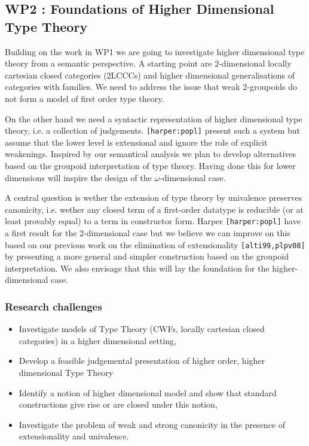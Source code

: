 \documentclass[a4paper]{article}
\renewcommand{\cite}[1]{{\tt[#1]}}
\begin{document}
\subsection*{WP2 : Foundations of Higher Dimensional Type Theory}

Building on the work in WP1 we are going to investigate higher
dimensional type theory from a semantic perspective. A starting point
are 2-dimensional locally cartesian closed categories (2LCCCs) and
higher dimensional generalisations of categories with families. We
need to address the issue that weak 2-groupoids do not form a model of
first order type theory. 

On the other hand we need a syntactic representation of higher
dimensional type theory, i.e. a collection of
judgements. \cite{harper:popl} present such a system but assume that
the lower level is extensional and ignore the role of explicit
weakenings. Inspired by our semantical analysis we plan to develop
alternatives based on the groupoid interpretation of type theory.
Having done this for lower dimensions will inspire the design of
the $\omega$-dimensional case.

A central question is wether the extension of type theory by
univalence preserves canonicity, i.e. wether any closed term of a
first-order datatype is reducible (or at least provably equal) to a
term in constructor form. Harper \cite{harper:popl} have a first
result for the 2-dimensional case but we believe we can improve on
this based on our previous work on the elimination of extensionality
\cite{alti99,plpv08} by presenting a more general and simpler
construction based on the groupoid interpretation. We also envisage
that this will lay the foundation for the higher-dimensional case.

\subsubsection*{Research challenges}
\label{sec:rsearch-challenges}

\begin{itemize}
\item Investigate models of Type Theory (CWFs, locally cartesian
  closed categories) in a higher dimensional setting,

\item Develop a feasible judgemental presentation of higher order,
  higher dimensional Type Theory

\item Identify a notion of higher dimensional model and show that
  standard constructions give rise or are closed under this notion,

\item Investigate the problem of weak and strong canonicity
  in the presence of extensionality and univalence.
\end{itemize}
\end{document}
